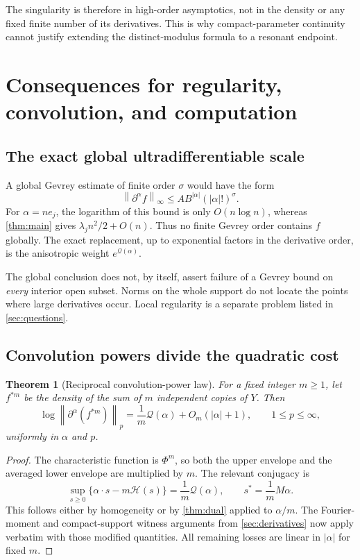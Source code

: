 \documentclass[11pt,a4paper]{article}
\numberwithin{equation}{section}
\newtheorem{theorem}{Theorem}[section]
\theoremstyle{definition}
\theoremstyle{remark}\newtheorem{remark}[theorem]{Remark}
\newcommand{\He}{\mathcal H}
\newcommand{\Qf}{\mathcal Q}
\newcommand{\norm}[1]{\left\lVert #1\right\rVert}
\begin{document}
The singularity is therefore in high-order asymptotics, not in the density
or any fixed finite number of its derivatives. This is why compact-parameter
continuity cannot justify extending the distinct-modulus formula to a
resonant endpoint.

\section{Consequences for regularity, convolution, and computation}
\label{sec:applications}

\subsection{The exact global ultradifferentiable scale}

A global Gevrey estimate of finite order $\sigma$ would have the form
\[
 \norm{\partial^\alpha f}_\infty\le A B^{|\alpha|}(|\alpha|!)^\sigma.
\]
For $\alpha=ne_j$, the logarithm of this bound is only $O(n\log n)$, whereas
\cref{thm:main} gives $\lambda_jn^2/2+O(n)$. Thus no finite Gevrey order
contains $f$ globally. The exact replacement, up to exponential factors in
the derivative order, is the anisotropic weight $e^{\Qf(\alpha)}$.

The global conclusion does not, by itself, assert failure of a Gevrey bound
on \emph{every} interior open subset. Norms on the whole support do not locate
the points where large derivatives occur. Local regularity is a separate
problem listed in \cref{sec:questions}.

\subsection{Convolution powers divide the quadratic cost}

\begin{theorem}[Reciprocal convolution-power law]
\label{thm:convolution}
For a fixed integer $m\ge1$, let $f^{*m}$ be the density of the sum of $m$
independent copies of $Y$. Then
\begin{equation}
 \log\norm{\partial^\alpha(f^{*m})}_p
     =\frac1m\Qf(\alpha)+O_m(|\alpha|+1),
 \qquad 1\le p\le\infty,
 \label{eq:convolution}
\end{equation}
uniformly in $\alpha$ and $p$.
\end{theorem}
\begin{proof}
The characteristic function is $\Phi^m$, so both the upper envelope and the
averaged lower envelope are multiplied by $m$. The relevant conjugacy is
\[
 \sup_{s\ge0}\{\alpha\cdot s-m\He(s)\}
      =\frac1m\Qf(\alpha),\qquad s^*=\frac1mM\alpha.
\]
This follows either by homogeneity or by \cref{thm:dual} applied to
$\alpha/m$. The Fourier-moment and compact-support witness arguments from
\cref{sec:derivatives} now apply verbatim with those modified quantities.
All remaining losses are linear in $|\alpha|$ for fixed $m$.
\end{proof}
\end{document}
